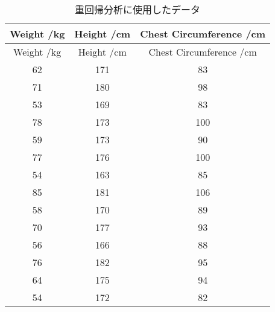 \begin{longtable}{ccc}
	\caption{重回帰分析に使用したデータ}\label{tab:regression-data}                                           \\
	\hline
	Weight /\si{\kilo\gram} & Height /\si{\centi\meter} & Chest Circumference /\si{\centi\meter} \\
	\hline
	\endfirsthead

	\hline
	Weight /\si{\kilo\gram} & Height /\si{\centi\meter} & Chest Circumference /\si{\centi\meter} \\
	\hline
	\endhead

	\hline
	\endfoot

	\hline
	\endlastfoot

	62                      & 171                       & 83                                     \\
	71                      & 180                       & 98                                     \\
	53                      & 169                       & 83                                     \\
	78                      & 173                       & 100                                    \\
	59                      & 173                       & 90                                     \\
	77                      & 176                       & 100                                    \\
	54                      & 163                       & 85                                     \\
	85                      & 181                       & 106                                    \\
	58                      & 170                       & 89                                     \\
	70                      & 177                       & 93                                     \\
	56                      & 166                       & 88                                     \\
	76                      & 182                       & 95                                     \\
	64                      & 175                       & 94                                     \\
	54                      & 172                       & 82                                     \\

\end{longtable}
